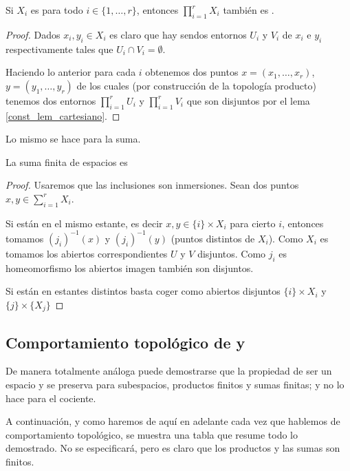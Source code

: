 \begin{lem}[Productos]
	Si $X_i$ es \hausdorff para todo $i\in\{1,\dots,r\}$, entonces $\prod_{i=1}^rX_i$ también es \hausdorff.
\end{lem}
\begin{proof}
	Dados $x_i,y_i\in X_i$ es claro que hay sendos entornos $U_i$ y $V_i$ de $x_i$ e $y_i$ respectivamente tales que $U_i\cap V_i=\emptyset$.
	
	Haciendo lo anterior para cada $i$ obtenemos dos puntos $x=(x_1,\dots,x_r)$, $y=(y_1,\dots,y_r)$ de los cuales (por construcción de la topología producto) tenemos dos entornos $\prod_{i=1}^rU_i$ y $\prod_{i=1}^rV_i$ que son disjuntos por el lema \ref{const_lem_cartesiano}.
\end{proof}
Lo mismo se hace para la suma.
\begin{lem}[Suma]
	La suma finita de espacios \hausdorff es \hausdorff
\end{lem}
\begin{proof}
	Usaremos que las inclusiones son inmersiones. Sean dos puntos $x,y\in\sum_{i=1}^rX_i$.
	
	Si están en el mismo estante, es decir $x,y\in \{i\}\times X_i$ para cierto $i$, entonces tomamos $(j_i)^{-1}(x)$ y $(j_i)^{-1}(y)$ (puntos distintos de $X_i$). Como $X_i$ es \hausdorff tomamos los abiertos correspondientes $U$ y $V$ disjuntos. Como $j_i$ es homeomorfismo los abiertos imagen también son disjuntos.
	
	Si están en estantes distintos basta coger como abiertos disjuntos $\{i\}\times X_i$ y $\{j\}\times\{X_j\}$
\end{proof}
\subsection{Comportamiento topológico de \frechet y \kolmogorov}
De manera totalmente análoga puede demostrarse que la propiedad de ser un espacio \kolmogorov y \frechet se preserva para subespacios, productos finitos y sumas finitas; y no lo hace para el cociente.

A continuación, y como haremos de aquí en adelante cada vez que hablemos de comportamiento topológico, se muestra una tabla que resume todo lo demostrado. No se especificará, pero es claro que los productos y las sumas son finitos.

